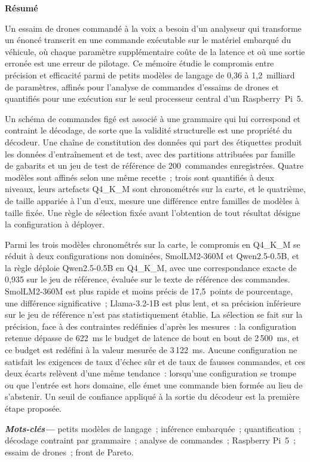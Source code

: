 \thispagestyle{empty}
\vspace*{4cm}
\begin{center}{\Huge\bfseries Résumé}\end{center}
\vskip 1cm
\noindent Un essaim de drones commandé à la voix a besoin d'un analyseur qui transforme un énoncé
transcrit en une commande exécutable sur le matériel embarqué du véhicule, où chaque paramètre
supplémentaire coûte de la latence et où une sortie erronée est une erreur de pilotage. Ce mémoire
étudie le compromis entre précision et efficacité parmi de petits modèles de langage de 0,36 à
1,2~milliard de paramètres, affinés pour l'analyse de commandes d'essaims de drones et quantifiés
pour une exécution sur le seul processeur central d'un Raspberry~Pi~5.

\vspace{0.3cm}
\noindent Un schéma de commandes figé est associé à une grammaire qui lui correspond et contraint le
décodage, de sorte que la validité structurelle est une propriété du décodeur. Une chaîne de
constitution des données qui part des étiquettes produit les données d'entraînement et de test,
avec des partitions attribuées par famille de gabarits et un jeu de test de référence de
200~commandes enregistrées. Quatre modèles sont affinés selon une même recette~; trois sont
quantifiés à deux niveaux, leurs artefacts Q4\_K\_M sont chronométrés sur la carte, et le
quatrième, de taille appariée à l'un d'eux, mesure une différence entre familles de modèles à
taille fixée. Une règle de sélection fixée
avant l'obtention de tout résultat désigne la configuration à déployer.

\vspace{0.3cm}
\noindent Parmi les trois modèles chronométrés sur la carte, le compromis en Q4\_K\_M se réduit à
deux configurations non dominées, SmolLM2-360M et Qwen2.5-0.5B, et la règle déploie Qwen2.5-0.5B en
Q4\_K\_M, avec une correspondance exacte de 0,935 sur le jeu de référence, évaluée sur le texte de
référence des commandes. SmolLM2-360M est plus rapide et moins précis de 17,5~points de pourcentage, une
différence significative~; Llama-3.2-1B est plus lent, et sa précision inférieure sur le jeu de
référence n'est pas statistiquement établie. La sélection se fait sur la précision, face à des
contraintes redéfinies d'après les mesures~: la configuration retenue dépasse de 622~ms le budget
de latence de bout en bout de 2\,500~ms, et ce budget est redéfini à la valeur mesurée de
3\,122~ms. Aucune configuration ne satisfait les exigences de taux d'échec sûr et de taux de fausses
commandes, et ces deux écarts relèvent d'une même tendance~: lorsqu'une configuration se trompe ou
que l'entrée est hors domaine, elle émet une commande bien formée au lieu de s'abstenir. Un seuil de
confiance appliqué à la sortie du décodeur est la première étape proposée.

\vspace{1cm}
\providecommand{\motscles}[1]{\textbf{\textit{Mots-clés---}} #1}
\motscles{petits modèles de langage~; inférence embarquée~; quantification~; décodage contraint
par grammaire~; analyse de commandes~; Raspberry Pi~5~; essaim de drones~; front de Pareto.}
\newpage
